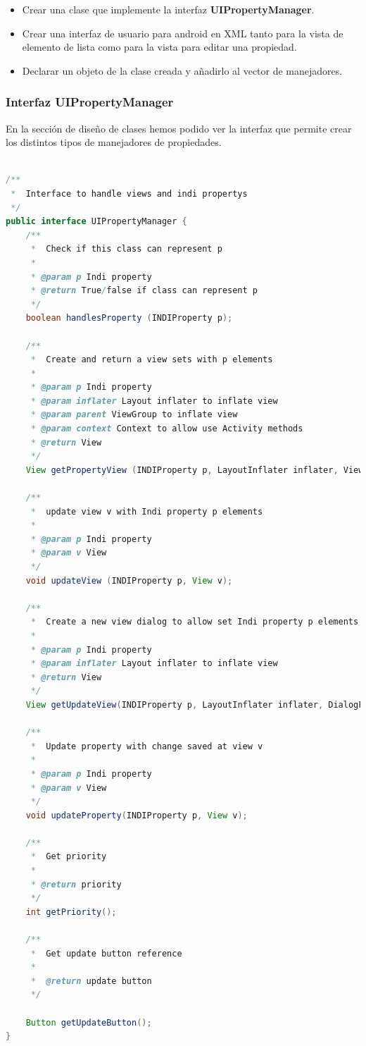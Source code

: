 \begin{itemize}
  \item Crear una clase que implemente la interfaz \textbf{UIPropertyManager}.
  \item Crear una interfaz de usuario para android en XML tanto para la vista de elemento de lista como para la vista para editar una propiedad.
  \item Declarar un objeto de la clase creada y añadirlo al vector de manejadores.
\end{itemize}


\subsubsection{Interfaz UIPropertyManager}

En la sección de diseño de clases hemos podido ver la interfaz que permite crear los distintos tipos de manejadores de propiedades.

\begin{lstlisting}[language=Java,caption={Interfaz UIPropertyManager},label={lst:ui_prop_manager}]

/**
 *  Interface to handle views and indi propertys
 */
public interface UIPropertyManager {
    /**
     *  Check if this class can represent p
     *
     * @param p Indi property
     * @return True/false if class can represent p
     */
    boolean handlesProperty (INDIProperty p);

    /**
     *  Create and return a view sets with p elements
     *
     * @param p Indi property
     * @param inflater Layout inflater to inflate view
     * @param parent ViewGroup to inflate view
     * @param context Context to allow use Activity methods
     * @return View
     */
    View getPropertyView (INDIProperty p, LayoutInflater inflater, ViewGroup parent, Context context);

    /**
     *  update view v with Indi property p elements
     *
     * @param p Indi property
     * @param v View
     */
    void updateView (INDIProperty p, View v);

    /**
     *  Create a new view dialog to allow set Indi property p elements
     *
     * @param p Indi property
     * @param inflater Layout inflater to inflate view
     * @return View
     */
    View getUpdateView(INDIProperty p, LayoutInflater inflater, DialogFragment fragment);

    /**
     *  Update property with change saved at view v
     *
     * @param p Indi property
     * @param v View
     */
    void updateProperty(INDIProperty p, View v);

    /**
     *  Get priority
     *
     * @return priority
     */
    int getPriority();

    /**
     *  Get update button reference
     *
     *  @return update button
     */

    Button getUpdateButton();
}

\end{lstlisting}

